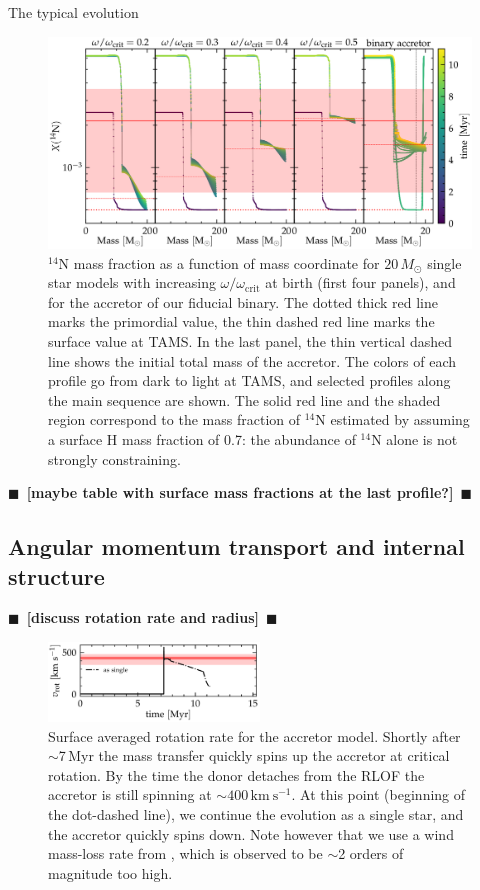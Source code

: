 \documentclass[twocolumn,twocolappendix,trackchanges]{aastex63}
\newcommand{\kms}{{\mathrm{km\ s^{-1}}}}
\newcommand{\todo}[1]{{\large $\blacksquare$~\textbf{\color{red}[#1]}}~$\blacksquare$}
\begin{document}
The typical evolution


\begin{figure}[htbp]
  \centering
  \includegraphics[width=\textwidth]{n14_struct_complete_zeta_ab}
  \caption{$^{14}\mathrm{N}$ mass fraction as a function of mass
    coordinate for $20\,M_\odot$ single star models with increasing
    $\omega/\omega_\mathrm{crit}$ at birth (first four panels), and
    for the accretor of our fiducial binary. The dotted thick red line
    marks the primordial value, the thin dashed red line marks the
    surface value at TAMS. In the last panel, the thin vertical dashed line shows the initial total mass of the accretor. The colors of each profile go from dark to
    light at TAMS, and selected profiles along the main sequence are
    shown. The solid red line and the shaded region correspond to the
    mass fraction of $^{14}\mathrm{N}$ estimated by
    \cite{villamariz:05} assuming a surface H mass fraction of 0.7:
    the abundance of $^{14}\mathrm{N}$ alone is not strongly constraining.}
  \label{fig:n14}
\end{figure}

\todo{maybe table with surface mass fractions at the last profile?}

\subsection{Angular momentum transport and internal structure}
\label{sec:rot}

\todo{discuss rotation rate and radius}

\begin{figure}[htbp]
  \includegraphics[width=0.5\textwidth]{zeta_rot}
  \caption{Surface averaged rotation rate for the accretor
    model. Shortly after $\sim$7\,Myr the mass transfer quickly spins
    up the accretor at critical rotation. By the time the donor
    detaches from the RLOF the accretor is still spinning at
    $\sim$$400\,\kms$. At this point (beginning of the dot-dashed line), we continue the evolution as a single star, and the accretor quickly spins down. Note however that we use a wind mass-loss rate from \cite{vink:01}, which is observed to be
    $\sim$2 orders of magnitude too high.}
  \label{fig:rot}
\end{figure}
\end{document}
